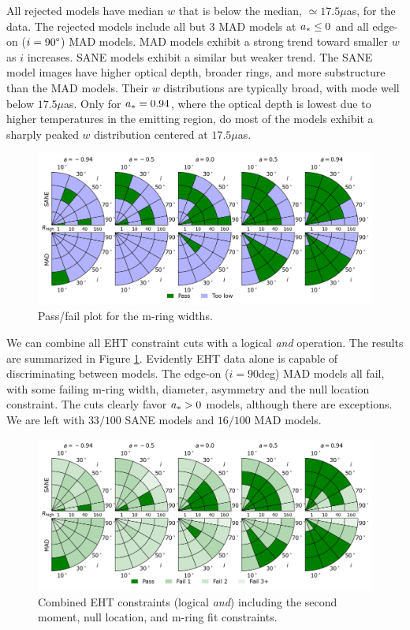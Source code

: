 All rejected models have median $w$ that is below the median, $ \simeq 17.5\mu$as, for the data. The rejected models include all but 3 MAD models at $a_* \le 0$ and all edge-on ($i = 90\degree$) MAD models.  MAD models exhibit a strong trend toward smaller $w$ as $i$ increases.  SANE models exhibit a similar but weaker trend. The SANE model images have  higher optical depth, broader rings, and more substructure than the MAD models.  Their $w$ distributions are typically broad, with mode well below $17.5\mu$as.  Only for $a_* = 0.94$, where the optical depth is lowest due to higher temperatures in the emitting region, do most of the models exhibit a sharply peaked $w$ distribution centered at $17.5\mu$as.  

\begin{figure}
 \centering
 \includegraphics[width=\textwidth]{./figures/Mring_w_Constraints.png}
  \caption{Pass/fail plot for the m-ring widths.}
\end{figure}


We can combine all EHT constraint cuts with a logical {\em and} operation.  The results are summarized in Figure  \ref{fig:all_EHT_constraints}.  Evidently EHT data alone is capable of discriminating between models.   The edge-on ($i = 90$deg) MAD models all fail, with some failing m-ring width, diameter, asymmetry and the null location constraint.  The cuts clearly favor $a_* > 0$ models, although there are exceptions.  We are left with $33/100$ SANE models and $16/100$ MAD models.

\begin{figure}
  \centering
    \includegraphics[width=\textwidth]{./figures/Interferometric_Constraints.png}
  \caption{Combined EHT constraints (logical {\em and}) including the second moment, null location, and m-ring fit constraints.}
  \label{fig:all_EHT_constraints}
\end{figure}

